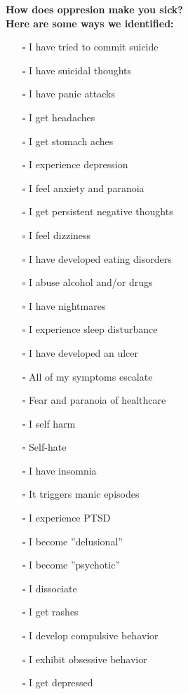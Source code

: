 \noindent\textcolor{ProcessBlue}{\textbf{\Large{How does oppresion make you sick?}}}\\
\textbf{\large{Here are some ways we identified:}}
\begin{multicols}{2}
\begin{itemize}
\item[$\square$]{I have tried to commit suicide}
\item[$\square$]{I have suicidal thoughts}
\item[$\square$]{I have panic attacks}
\item[$\square$]{I get headaches}
\item[$\square$]{I get stomach aches}
\item[$\square$]{I experience depression}
\item[$\square$]{I feel anxiety and paranoia}
\item[$\square$]{I get persistent negative thoughts}
\item[$\square$]{I feel dizziness}
\item[$\square$]{I have developed eating disorders}
\item[$\square$]{I abuse alcohol and/or drugs}
\item[$\square$]{I have nightmares}
\item[$\square$]{I experience sleep disturbance}
\item[$\square$]{I have developed an ulcer}
\item[$\square$]{All of my symptoms escalate}
\item[$\square$]{Fear and paranoia of healthcare}
\item[$\square$]{I self harm}
\item[$\square$]{Self-hate}
\item[$\square$]{I have insomnia}
\item[$\square$]{It triggers manic episodes}
\item[$\square$]{I experience PTSD}
\item[$\square$]{I become ''delusional''}
\item[$\square$]{I become ''psychotic''}
\item[$\square$]{I dissociate}
\item[$\square$]{I get rashes}
\item[$\square$]{I develop compulsive behavior}
\item[$\square$]{I exhibit obsessive behavior}
\item[$\square$]{I get depressed}
\end{itemize}
\end{multicols}


